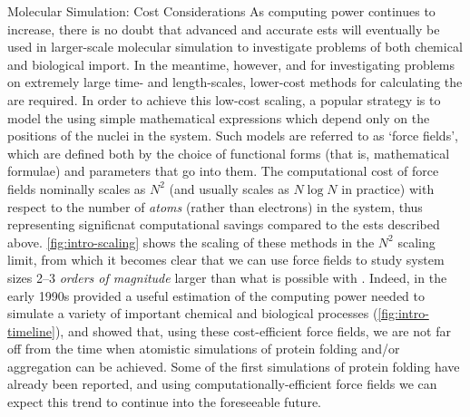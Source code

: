\begin{section}{Molecular Simulation: Cost Considerations}
As computing power continues to increase, there is no doubt that advanced and
accurate \glspl{est} will eventually be used in larger-scale molecular
simulation to investigate problems of both chemical and biological
import.\cite{Ballone2014} In
the meantime, however, and for investigating problems on extremely large time-
and length-scales, lower-cost methods for calculating the \pes are required.
In order to achieve this low-cost scaling, a popular strategy is to model the
\pes using simple mathematical expressions which depend only on the positions
of the nuclei in the system. Such models are referred to as `force fields',
which are defined both by the choice of functional forms (that is,
mathematical formulae) and parameters that go into them.
The computational cost of force fields nominally scales as $N^2$ (and usually
scales as $N\log N$ in
practice) with respect
to the number of \emph{atoms} (rather than electrons) in the system, thus
representing significnat computational savings compared to
the \glspl{est} described above.
\cref{fig:intro-scaling} shows the scaling of these methods in the $N^2$
scaling limit, from which it becomes clear that we can use force fields
to study system sizes 2--3 \emph{orders of magnitude} larger than what is
possible with \dft.
%
Indeed, in the early 1990s \citet{Chan1993} provided a useful estimation
of the computing power needed to simulate a variety of 
important chemical and biological processes (\cref{fig:intro-timeline}), and showed that,
using these cost-efficient force fields,
we are not far off from the time when atomistic simulations of protein folding and/or aggregation
can be achieved.
Some of the first simulations of protein
folding have already been reported, and using computationally-efficient force
fields we can expect this trend to continue
into the foreseeable future.\cite{Lane2013}



\end{section}
